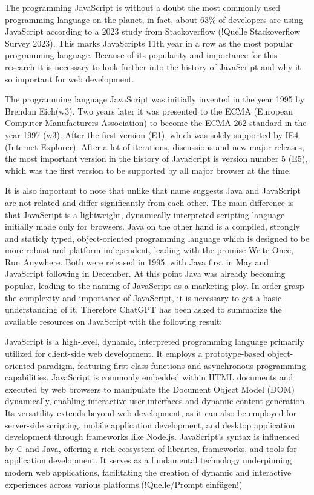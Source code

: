 The programming JavaScript is without a doubt the most commonly used programming language on the planet, in fact, about 63\% of developers are using JavaScript according to a 2023 study from Stackoverflow (!Quelle Stackoverflow Survey 2023). This marks JavaScripts 11th year in a row as the most popular programming language. Because of its popularity and importance for this research it is necessary to look further into the history of JavaScript and why it so important for web development.

The programming language JavaScript was initially invented in the year 1995 by Brendan Eich(w3). Two years later it was presented to the ECMA (European Computer Manufacturers Association) to become the ECMA-262 standard in the year 1997 (w3). After the first version (E1), which was solely supported by IE4 (Internet Explorer).
After a lot of iterations, discussions and new major releases, the most important version in the history of JavaScript is version number 5 (E5), which was the first version to be supported by all major browser at the time.

It is also important to note that unlike that name suggests Java and JavaScript are not related and differ significantly from each other.  The main difference is that JavaScript is a lightweight, dynamically interpreted scripting-language initially made only for browsers. Java on the other hand is a compiled, strongly and staticly typed, object-oriented programming language which is designed to be more robust and platform independent, leading with the promise \dq Write Once, Run Anywhere\dq . Both were released in 1995, with Java first in May and JavaScript following in December. At this point Java was already becoming popular, leading to the naming of JavaScript as a marketing ploy.
In order grasp the complexity and importance of JavaScript, it is necessary to get a basic understanding of it. Therefore ChatGPT has been asked to summarize the available resources on JavaScript with the following result:

\dq JavaScript is a high-level, dynamic, interpreted programming language primarily utilized for client-side web development. It employs a prototype-based object-oriented paradigm, featuring first-class functions and asynchronous programming capabilities. JavaScript is commonly embedded within HTML documents and executed by web browsers to manipulate the Document Object Model (DOM) dynamically, enabling interactive user interfaces and dynamic content generation. Its versatility extends beyond web development, as it can also be employed for server-side scripting, mobile application development, and desktop application development through frameworks like Node.js. JavaScript's syntax is influenced by C and Java, offering a rich ecosystem of libraries, frameworks, and tools for application development. It serves as a fundamental technology underpinning modern web applications, facilitating the creation of dynamic and interactive experiences across various platforms.\dq (!Quelle/Prompt einfügen!)

